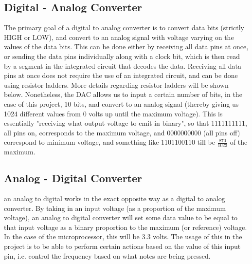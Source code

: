 
\subsection{Digital - Analog Converter}\label{subsec:digital---analog-converter}

The primary goal of a digital to analog converter is to convert data bits (strictly HIGH or LOW), and convert to an analog signal with voltage varying on the values of the data bits.
This can be done either by receiving all data pins at once, or sending the data pins individually along with a clock bit, which is then read by a segment in the integrated circuit that decodes the data.
Receiving all data pins at once does not require the use of an integrated circuit, and can be done using resistor ladders.
More details regarding resistor ladders will be shown below.
Nonetheless, the DAC allows us to input a certain number of bits, in the case of this project, 10 bits, and convert to an analog signal (thereby giving us 1024 different values from 0 volts up until the maximum voltage).
This is essentially "receiving what output voltage to emit in binary", so that 1111111111, all pins on, corresponds to the maximum voltage, and 0000000000 (all pins off) correspond to minimum voltage, and something like 1101100110 till be $\frac{870}{1023}$ of the maximum. 

\subsection{Analog - Digital Converter}\label{subsec:analog---digital-converter}

an analog to digital works in the exact opposite way as a digital to analog converter.
By taking in an input voltage (as a proportion of the maximum voltage), an analog to digital converter will set some data value to be equal to that input voltage as a binary proportion to the maximum (or reference) voltage.
In the case of the microprocessor, this will be 3.3 volts.
The usage of this in the project is to be able to perform certain actions based on the value of this input pin, i.e. control the frequency based on what notes are being pressed. 

